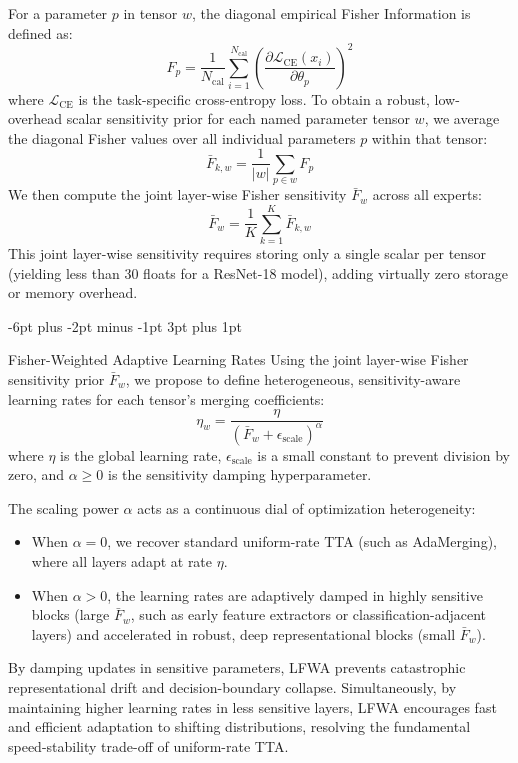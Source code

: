 \documentclass{article}
\makeatletter
\theoremstyle{plain}
\theoremstyle{definition}
\theoremstyle{remark}
\renewcommand{\subsection}{\@startsection{subsection}{2}{\z@}%
                          {-6pt plus -2pt minus -1pt}%
                          {3pt plus 1pt}%
                          {\normalfont\normalsize\bfseries\raggedright}}
\makeatother
\begin{document}
For a parameter $p$ in tensor $w$, the diagonal empirical Fisher Information is defined as:
\begin{equation}
F_{p} = \frac{1}{N_{\text{cal}}} \sum_{i=1}^{N_{\text{cal}}} \left(\frac{\partial \mathcal{L}_{\text{CE}}(x_i)}{\partial \theta_p}\right)^2
\end{equation}
where $\mathcal{L}_{\text{CE}}$ is the task-specific cross-entropy loss. To obtain a robust, low-overhead scalar sensitivity prior for each named parameter tensor $w$, we average the diagonal Fisher values over all individual parameters $p$ within that tensor:
\begin{equation}
\bar{F}_{k, w} = \frac{1}{|w|} \sum_{p \in w} F_{p}
\end{equation}
We then compute the joint layer-wise Fisher sensitivity $\bar{F}_w$ across all experts:
\begin{equation}
\bar{F}_w = \frac{1}{K} \sum_{k=1}^K \bar{F}_{k, w}
\end{equation}
This joint layer-wise sensitivity requires storing only a single scalar per tensor (yielding less than 30 floats for a ResNet-18 model), adding virtually zero storage or memory overhead.

\subsection{Fisher-Weighted Adaptive Learning Rates}
Using the joint layer-wise Fisher sensitivity prior $\bar{F}_w$, we propose to define heterogeneous, sensitivity-aware learning rates for each tensor's merging coefficients:
\begin{equation}
\eta_{w} = \frac{\eta}{\left(\bar{F}_w + \epsilon_{\text{scale}}\right)^\alpha}
\end{equation}
where $\eta$ is the global learning rate, $\epsilon_{\text{scale}}$ is a small constant to prevent division by zero, and $\alpha \ge 0$ is the sensitivity damping hyperparameter. 

The scaling power $\alpha$ acts as a continuous dial of optimization heterogeneity:
\begin{itemize}\setlength{\itemsep}{1pt}\setlength{\parskip}{0pt}\setlength{\parsep}{0pt}
    \item When $\alpha = 0$, we recover standard uniform-rate TTA (such as AdaMerging), where all layers adapt at rate $\eta$.
    \item When $\alpha > 0$, the learning rates are adaptively damped in highly sensitive blocks (large $\bar{F}_w$, such as early feature extractors or classification-adjacent layers) and accelerated in robust, deep representational blocks (small $\bar{F}_w$).
\end{itemize}
By damping updates in sensitive parameters, LFWA prevents catastrophic representational drift and decision-boundary collapse. Simultaneously, by maintaining higher learning rates in less sensitive layers, LFWA encourages fast and efficient adaptation to shifting distributions, resolving the fundamental speed-stability trade-off of uniform-rate TTA.
\end{document}
